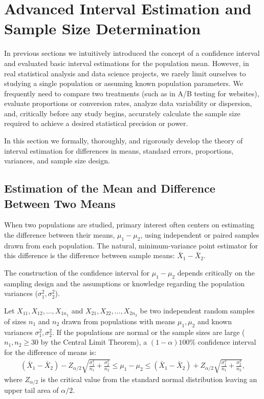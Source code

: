 \section{Advanced Interval Estimation and Sample Size Determination}

In previous sections we intuitively introduced the concept of a confidence interval and evaluated basic interval estimations for the population mean. However, in real statistical analysis and data science projects, we rarely limit ourselves to studying a single population or assuming known population parameters. We frequently need to compare two treatments (such as in A/B testing for websites), evaluate proportions or conversion rates, analyze data variability or dispersion, and, critically before any study begins, accurately calculate the sample size required to achieve a desired statistical precision or power.

In this section we formally, thoroughly, and rigorously develop the theory of interval estimation for differences in means, standard errors, proportions, variances, and sample size design.

\subsection{Estimation of the Mean and Difference Between Two Means}

When two populations are studied, primary interest often centers on estimating the difference between their means, $\mu_1 - \mu_2$, using independent or paired samples drawn from each population. The natural, minimum-variance point estimator for this difference is the difference between sample means: $\bar{X}_1 - \bar{X}_2$.

The construction of the confidence interval for $\mu_1 - \mu_2$ depends critically on the sampling design and the assumptions or knowledge regarding the population variances ($\sigma_1^2, \sigma_2^2$).

\begin{teorema}
	Let $X_{11}, X_{12}, \ldots, X_{1n_1}$ and $X_{21}, X_{22}, \ldots, X_{2n_2}$ be two independent random samples of sizes $n_1$ and $n_2$ drawn from populations with means $\mu_1, \mu_2$ and known variances $\sigma_1^2, \sigma_2^2$. If the populations are normal or the sample sizes are large ($n_1, n_2 \geq 30$ by the Central Limit Theorem), a $(1-\alpha)100\%$ confidence interval for the difference of means is:
	\begin{align}
		(\bar{X}_1 - \bar{X}_2) - Z_{\alpha/2} \sqrt{\frac{\sigma_1^2}{n_1} + \frac{\sigma_2^2}{n_2}} \leq \mu_1 - \mu_2 \leq (\bar{X}_1 - \bar{X}_2) + Z_{\alpha/2} \sqrt{\frac{\sigma_1^2}{n_1} + \frac{\sigma_2^2}{n_2}},
	\end{align}
	where $Z_{\alpha/2}$ is the critical value from the standard normal distribution leaving an upper tail area of $\alpha/2$.
\end{teorema}

